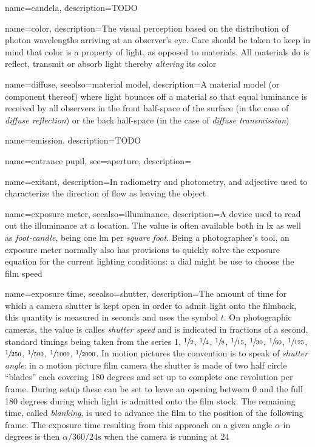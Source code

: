 {
	name={candela},
	description={TODO}
}

{
	name={color},
	description={The visual perception based on the distribution of photon wavelengths arriving
		at an observer's eye. Care should be taken to keep in mind that color is a property of
		light, as opposed to materials. All materials do is reflect, transmit or absorb light
		thereby \emph{altering} its color}
}

{
	name={diffuse},
	seealso={material model},
	description={A material model (or component thereof) where light bounces off a material
		so that equal luminance is received by all observers in the front half-space of the
		surface (in the case of \textsl{diffuse reflection}) or the back half-space (in the
		case of \textsl{diffuse transmission})}
}

{
	name={emission},
	description={TODO}
}

{
	name={entrance pupil},
	see={aperture},
	description=\nopostdesc
}

{
	name={exitant},
	description={In radiometry and photometry, and adjective used to characterize the direction of
		flow as leaving the object}
}


{
	name={exposure meter},
	seealso={illuminance},
	description={A device used to read out the illuminance at a location. The value is often
		available both in \unit{\lux} as well as \textsl{foot-candle}, being one \unit{\lumen}
		per \textsl{square foot}. Being a photographer's tool, an exposure meter normally also
		has provisions to quickly solve the exposure equation for the current lighting
		conditions: a dial might be use to choose the film speed }
}

{
	name={exposure time},
	seealso={shutter},
	description={The amount of time for which a camera shutter is kept open in order to
		admit light onto the filmback, this quantity is measured in seconds and uses the
		symbol $t$. 
		On photographic cameras, the value is calles \textsl{shutter speed} and is 
		indicated in fractions of a second, standard timings being
		taken from the series $1$, $\sfrac12$, $\sfrac14$, $\sfrac18$, 
		$\sfrac1{15}$, $\sfrac1{30}$, $\sfrac1{60}$, $\sfrac1{125}$, 
		$\sfrac1{250}$, $\sfrac1{500}$, $\sfrac1{1000}$, $\sfrac1{2000}$.
		In motion pictures the convention is to speak of \textsl{shutter angle}:
		in a motion picture film camera the shutter is made of two half circle ``blades'' 
		each covering 180 degrees and set up to complete one revolution per frame. 
		During setup these can be set to leave an opening between 0 and the
		full 180 degrees during which light is admitted onto the film stock.
		The remaining time, called \textsl{blanking}, is used to advance the film
		to the position of the following frame. The exposure time resulting from this 
		approach on a given angle $\alpha$ in degrees is then $\alpha/360/24 \unit{\second}$
		when the camera is running at $24$ }
}

